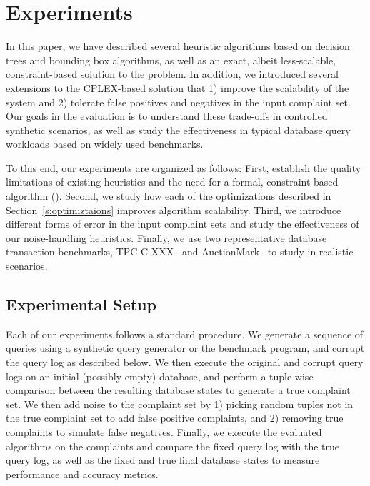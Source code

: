 
%
%
%
%
%
\section{Experiments}

In this paper, we have described several heuristic algorithms based on decision trees 
and bounding box algorithms, as well as an exact, albeit less-scalable,
constraint-based solution to the \prob problem.  In addition, we 
introduced  several extensions to the CPLEX-based solution that 
1) improve the scalability of the system and 2) tolerate false positives and 
negatives in the input complaint set.
Our goals in the evaluation is to understand these trade-offs in
controlled synthetic scenarios, as well as study the effectiveness
in typical database query workloads based on widely used benchmarks.

To this end, our experiments are organized as follows: First, 
establish the quality limitations of existing heuristics and the need for a formal, 
constraint-based algorithm (\exact).  Second, we study how each of the 
optimizations described in Section~\ref{s:optimiztaions} improves algorithm scalability.
Third, we introduce different forms of error in the input complaint sets and study the 
effectiveness of our noise-handling heuristics.  Finally, we use two
representative database transaction benchmarks, TPC-C XXX~\cite{tpcc} and AuctionMark~\cite{auctionmark}
to study \sys in realistic scenarios.




%
%

\subsection{Experimental Setup}


Each of our experiments follows a standard procedure.  
We generate a sequence of queries using a synthetic query generator or 
the benchmark program, and corrupt the query log as described below. 
We then execute the original and corrupt query logs on an initial (possibly empty) database,
and perform a tuple-wise comparison between the resulting database states 
to generate a true complaint set.  
We then add noise to the complaint set by 1) picking random tuples not in the true
complaint set to add false positive complaints, and 2) removing true complaints to simulate false negatives.
Finally, we execute the evaluated algorithms on the complaints and compare the fixed
query log with the true query log, as well as the fixed and true
final database states to measure performance and accuracy metrics.

